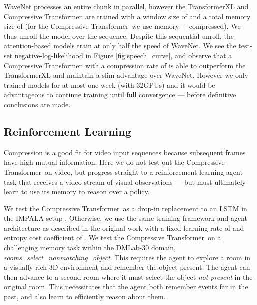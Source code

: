 \documentclass{article} \usepackage{iclr2020_conference,times}
\newcommand{\model}{Compressive Transformer}
\begin{document}
WaveNet processes an entire chunk in parallel, however the TransformerXL and \model~are trained with a window size of  and a total memory size of  (for the \model~we use  memory +  compressed). We thus unroll the model over the sequence. Despite this sequential unroll, the attention-based models train at only half the speed of WaveNet. We see the test-set  negative-log-likelihood in Figure \ref{fig:speech_curve}, and observe that a \model~with a compression rate of  is able to outperform the TransformerXL and maintain a slim advantage over WaveNet. However we only trained models for at most one week (with 32GPUs) and it would be advantageous to continue training until full convergence --- before definitive conclusions are made. 
\subsection{Reinforcement Learning}
Compression is a good fit for video input sequences because subsequent frames have high mutual information. Here we do not test out the \model~on video, but progress straight to a reinforcement learning agent task that receives a video stream of visual observations --- but must ultimately learn to use its memory to reason over a policy.

We test the \model~as a drop-in replacement to an LSTM in the IMPALA setup \citep{espeholt2018impala}. Otherwise, we use the same training framework and agent architecture as described in the original work with a fixed learning rate of  and entropy cost coefficient of . 
We test the \model~on a challenging memory task within the DMLab-30 \citep{beattiedm2016} domain, \textit{rooms\_select\_nonmatching\_object}. This requires the agent to explore a room in a visually rich 3D environment and remember the object present. The agent can then advance to a second room where it must select the object \emph{not present} in the original room. This necessitates that the agent both remember events far in the past, and also learn to efficiently reason about them.
\end{document}
